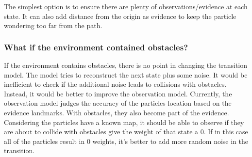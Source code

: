 \documentclass[a4paper,11pt]{report}
\begin{document}
		The simplest option is to ensure there are plenty of observations/evidence at each state. It can also add distance from the origin as evidence to keep the particle wondering too far from the path.
		
		\subsubsection{What if the environment contained obstacles?}
		If the environment contains obstacles, there is no point in changing the transition model. The model tries to reconstruct the next state plus some noise. It would be inefficient to check if the additional noise leads to collisions with obstacles. Instead, it would be better to improve the observation model. Currently, the observation model judges the accuracy of the particles location based on the evidence landmarks. With obstacles, they also become part of the evidence. Considering the particles have a known map, it should be able to observe if they are about to collide with obstacles give the weight of that state a 0. If in this case all of the particles result in 0 weights, it's better to add more random noise in the transition.
			
\end{document}
